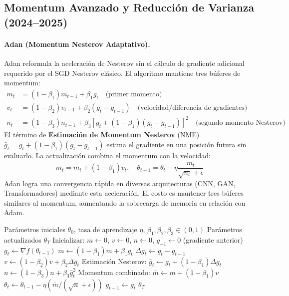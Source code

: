 \documentclass[11pt,a4paper]{article}
\begin{document}
\subsection{Momentum Avanzado y Reducción de Varianza (2024--2025)}
\paragraph{Adan (Momentum Nesterov Adaptativo).}
Adan reformula la aceleración de Nesterov sin el cálculo de gradiente adicional requerido por el SGD Nesterov clásico. El algoritmo mantiene tres búferes de momentum:
\begin{align}
m_t &= (1-\beta_1)m_{t-1} + \beta_1 g_t \quad\text{(primer momento)} \\
v_t &= (1-\beta_2)v_{t-1} + \beta_2(g_t - g_{t-1}) \quad\text{(velocidad/diferencia de gradientes)} \\
n_t &= (1-\beta_3)n_{t-1} + \beta_3[g_t + (1-\beta_1)(g_t-g_{t-1})]^2 \quad\text{(segundo momento Nesterov)}
\end{align}
El término de \textbf{Estimación de Momentum Nesterov} (NME) $\bar{g}_t = g_t + (1-\beta_1)(g_t-g_{t-1})$ estima el gradiente en una posición futura sin evaluarlo. La actualización combina el momentum con la velocidad:
\[\bar{m}_t = m_t + (1-\beta_1)v_t, \quad \theta_{t+1} = \theta_t - \eta\frac{\bar{m}_t}{\sqrt{n_t}+\epsilon}\]
Adan logra una convergencia rápida en diversas arquitecturas (CNN, GAN, Transformadores) mediante esta aceleración. El costo es mantener tres búferes similares al momentum, aumentando la sobrecarga de memoria en relación con Adam.

\begin{algorithm}[H]
\caption{Adan (Momentum Nesterov Adaptativo)}
\label{alg:adan}
\begin{algorithmic}[1]
\Require Parámetros iniciales $\theta_0$, tasa de aprendizaje $\eta$, $\beta_1, \beta_2, \beta_3 \in (0,1)$
\Ensure Parámetros actualizados $\theta_T$
\State Inicializar: $m \gets 0$, $v \gets 0$, $n \gets 0$, $g_{-1} \gets 0$ (gradiente anterior)
    \State $g_t \gets \nabla f(\theta_{t-1})$
    \State $m \gets (1-\beta_1) m + \beta_1 g_t$
    \State $\Delta g_t \gets g_t - g_{t-1}$
    \State $v \gets (1-\beta_2) v + \beta_2 \Delta g_t$
    \State Estimación Nesterov: $\bar{g}_t \gets g_t + (1-\beta_1) \Delta g_t$
    \State $n \gets (1-\beta_3) n + \beta_3 \bar{g}_t^2$
    \State Momentum combinado: $\bar{m} \gets m + (1-\beta_1) v$
    \State $\theta_t \gets \theta_{t-1} - \eta (\bar{m} / (\sqrt{n} + \epsilon))$
    \State $g_{t-1} \gets g_t$
\EndFor
\Return $\theta_T$
\end{algorithmic}
\end{algorithm}
\end{document}
